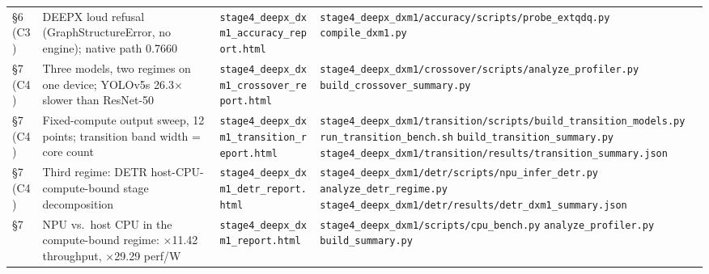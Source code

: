 \documentclass[11pt]{article}
\begin{document}
\begin{longtable}{L{0.9cm} L{4.0cm} L{4.3cm} L{5.0cm}}
\S6 (C3) & DEEPX loud refusal (GraphStructureError, no engine); native path 0.7660 & \texttt{stage4\_\allowbreak deepx\_\allowbreak dxm1\_\allowbreak accuracy\_\allowbreak report.html} & \texttt{stage4\_\allowbreak deepx\_\allowbreak dxm1/\allowbreak accuracy/\allowbreak scripts/\allowbreak probe\_\allowbreak extqdq.py} \newline \texttt{compile\_\allowbreak dxm1.py} \\
\addlinespace[2pt]
\S7 (C4) & Three models, two regimes on one device; YOLOv5s 26.3$\times$ slower than ResNet-50 & \texttt{stage4\_\allowbreak deepx\_\allowbreak dxm1\_\allowbreak crossover\_\allowbreak report.html} & \texttt{stage4\_\allowbreak deepx\_\allowbreak dxm1/\allowbreak crossover/\allowbreak scripts/\allowbreak analyze\_\allowbreak profiler.py} \newline \texttt{build\_\allowbreak crossover\_\allowbreak summary.py} \\
\addlinespace[2pt]
\S7 (C4) & Fixed-compute output sweep, 12 points; transition band width = core count & \texttt{stage4\_\allowbreak deepx\_\allowbreak dxm1\_\allowbreak transition\_\allowbreak report.html} & \texttt{stage4\_\allowbreak deepx\_\allowbreak dxm1/\allowbreak transition/\allowbreak scripts/\allowbreak build\_\allowbreak transition\_\allowbreak models.py} \newline \texttt{run\_\allowbreak transition\_\allowbreak bench.sh} \newline \texttt{build\_\allowbreak transition\_\allowbreak summary.py} \newline \texttt{stage4\_\allowbreak deepx\_\allowbreak dxm1/\allowbreak transition/\allowbreak results/\allowbreak transition\_\allowbreak summary.json} \\
\addlinespace[2pt]
\S7 (C4) & Third regime: DETR host-CPU-compute-bound stage decomposition & \texttt{stage4\_\allowbreak deepx\_\allowbreak dxm1\_\allowbreak detr\_\allowbreak report.html} & \texttt{stage4\_\allowbreak deepx\_\allowbreak dxm1/\allowbreak detr/\allowbreak scripts/\allowbreak npu\_\allowbreak infer\_\allowbreak detr.py} \newline \texttt{analyze\_\allowbreak detr\_\allowbreak regime.py} \newline \texttt{stage4\_\allowbreak deepx\_\allowbreak dxm1/\allowbreak detr/\allowbreak results/\allowbreak detr\_\allowbreak dxm1\_\allowbreak summary.json} \\
\addlinespace[2pt]
\S7 & NPU vs.~host CPU in the compute-bound regime: $\times$11.42 throughput, $\times$29.29 perf/W & \texttt{stage4\_\allowbreak deepx\_\allowbreak dxm1\_\allowbreak report.html} & \texttt{stage4\_\allowbreak deepx\_\allowbreak dxm1/\allowbreak scripts/\allowbreak cpu\_\allowbreak bench.py} \newline \texttt{analyze\_\allowbreak profiler.py} \newline \texttt{build\_\allowbreak summary.py} \\

\end{longtable}
\end{document}

